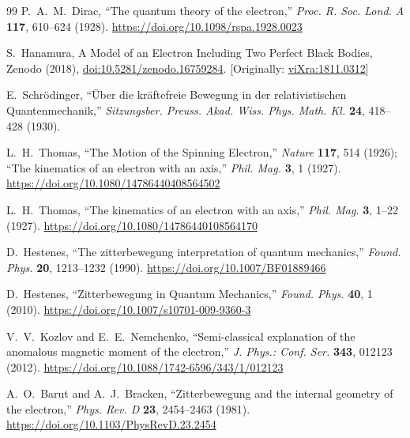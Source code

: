 \documentclass[%
 reprint,
 amsmath,amssymb,
 aps,
]{revtex4-1}
\numberwithin{equation}{section}%
\begin{document}
\begin{thebibliography}{99}
P.~A.~M.~Dirac, 
``The quantum theory of the electron,'' 
\textit{Proc. R. Soc. Lond. A} \textbf{117}, 610--624 (1928). 
\href{https://doi.org/10.1098/rspa.1928.0023}{https://doi.org/10.1098/rspa.1928.0023}

S.~Hanamura, A Model of an Electron Including Two Perfect Black Bodies, Zenodo (2018), \href{https://doi.org/10.5281/zenodo.16759284}{doi:10.5281/zenodo.16759284}. [Originally: \href{https://vixra.org/abs/1811.0312}{viXra:1811.0312}]

E.~Schr{\"o}dinger, 
``{\"U}ber die kr{\"a}ftefreie Bewegung in der relativistischen Quantenmechanik,'' 
\textit{Sitzungsber. Preuss. Akad. Wiss. Phys. Math. Kl.} \textbf{24}, 418--428 (1930).

L.~H.~Thomas, 
``The Motion of the Spinning Electron,'' 
\textit{Nature} \textbf{117}, 514 (1926); 
``The kinematics of an electron with an axis,''
\textit{Phil. Mag.} \textbf{3}, 1 (1927). 
\href{https://doi.org/10.1080/14786440408564502}{https://doi.org/10.1080/14786440408564502}

L.~H.~Thomas, 
``The kinematics of an electron with an axis,'' 
\textit{Phil. Mag.} \textbf{3}, 1--22 (1927). 
\href{https://doi.org/10.1080/14786440108564170}{https://doi.org/10.1080/14786440108564170}

D.~Hestenes, 
``The zitterbewegung interpretation of quantum mechanics,'' 
\textit{Found. Phys.} \textbf{20}, 1213--1232 (1990). 
\href{https://doi.org/10.1007/BF01889466}{https://doi.org/10.1007/BF01889466}

D.~Hestenes, 
``Zitterbewegung in Quantum Mechanics,'' 
\textit{Found. Phys.} \textbf{40}, 1 (2010). 
\href{https://doi.org/10.1007/s10701-009-9360-3}{https://doi.org/10.1007/s10701-009-9360-3}

V.~V.~Kozlov and E.~E.~Nemchenko, 
``Semi-classical explanation of the anomalous magnetic moment of the electron,'' 
\textit{J. Phys.: Conf. Ser.} \textbf{343}, 012123 (2012).
\href{https://doi.org/10.1088/1742-6596/343/1/012123}{https://doi.org/10.1088/1742-6596/343/1/012123}

A.~O.~Barut and A.~J.~Bracken, 
``Zitterbewegung and the internal geometry of the electron,'' 
\textit{Phys. Rev. D} \textbf{23}, 2454--2463 (1981). 
\href{https://doi.org/10.1103/PhysRevD.23.2454}{https://doi.org/10.1103/PhysRevD.23.2454}


\end{thebibliography}
\end{document}
